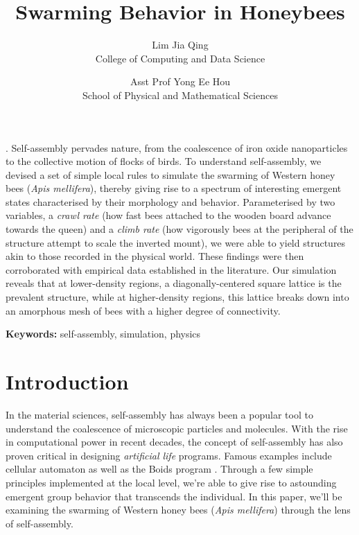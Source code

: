 \documentclass[a4paper,10pt]{article}
\title{Swarming Behavior in Honeybees}
\date{}
\author{
    {Lim Jia Qing} \\
    College of Computing and Data Science  \\
    \and
    {Asst Prof Yong Ee Hou} \\
    School of Physical and Mathematical Sciences \\
}
\renewenvironment{abstract}{
    \small
\noindent\textbf{\textit{\abstractname}}.\hspace{1em}} %
{}
\begin{document}
\maketitle

\begin{multicols}{2}

    \begin{abstract}
        Self-assembly pervades nature, from the coalescence of iron oxide nanoparticles
        to the collective motion of flocks of birds. To understand self-assembly, we
        devised a set of simple local rules to simulate the swarming of Western
        honey bees (\textit{Apis mellifera}), thereby giving rise to a spectrum of
        interesting emergent states characterised by their morphology and behavior.
        Parameterised by two variables, a \textit{crawl rate} (how fast bees attached
        to the wooden board advance towards the queen) and a \textit{climb rate} (how
        vigorously bees at the peripheral of the structure attempt to scale the inverted
        mount), we were able to yield structures akin to those recorded in the
        physical world. These findings were then corroborated with empirical data established
        in the literature. Our simulation reveals that at lower-density
        regions, a diagonally-centered square lattice is the prevalent structure, while
        at higher-density regions, this lattice breaks down into an amorphous mesh
        of bees with a higher degree of connectivity.
    \end{abstract}

    \textbf{Keywords:} self-assembly, simulation, physics

    \section{Introduction}

    In the material sciences, self-assembly has always been a popular tool to understand the
    coalescence of microscopic particles and molecules. With the rise in computational power in recent
    decades, the concept of self-assembly has also proven critical in designing \textit{artificial life}
    programs. Famous examples include cellular automaton \cite{fetecau2012mathematical} as well as
    the Boids program \cite{reynolds1987flocks}. Through a few simple principles implemented at
    the local level, we're able to give rise to astounding emergent group behavior that transcends
    the individual. In this paper, we'll be examining the swarming of Western honey bees
    (\textit{Apis mellifera}) through the lens of self-assembly.


\end{multicols}
\end{document}
